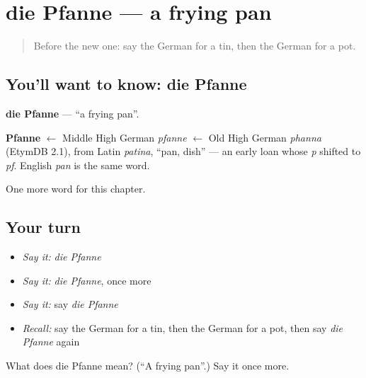 \section[die Pfanne]{die Pfanne — a frying pan}

\label{lesson:GE-C201-pfanne}



\begin{quote}
Before the new one: say the German for a tin, then the German for a pot.
\end{quote}

\subsection*{You'll want to know: die Pfanne}
\textbf{die Pfanne} — \textquotedblleft{}a frying pan\textquotedblright{}.

\begin{cousinweb}
\textbf{Pfanne} $\leftarrow$ Middle High German \emph{pfanne} $\leftarrow$ Old High German \emph{phanna} (EtymDB 2.1), from Latin \emph{patina}, \textquotedblleft{}pan, dish\textquotedblright{} — an early loan whose \emph{p} shifted to \emph{pf}. English \emph{pan} is the same word.
\end{cousinweb}

\begin{grammarlens}[title={What you've built}]
One more word for this chapter.
\end{grammarlens}

\subsection*{Your turn}
\begin{itemize}
\raggedright
  \item \emph{Say it:} \emph{die Pfanne}
  \item \emph{Say it:} \emph{die Pfanne}, once more
  \item \emph{Say it:} say \emph{die Pfanne}
  \item \emph{Recall:} say the German for a tin, then the German for a pot, then say \emph{die Pfanne} again
\end{itemize}

\begin{tcolorbox}[breakable,colback=teal!4,colframe=teal!35!black,title={Before you move on}]
What does die Pfanne mean? (\textquotedblleft{}A frying pan\textquotedblright{}.) Say it once more.
\end{tcolorbox}
